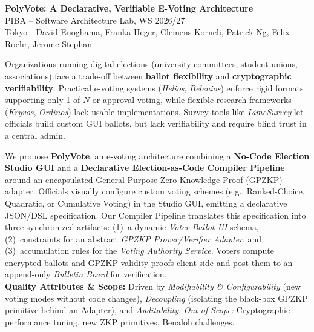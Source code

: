 \documentclass[11pt,a4paper]{article}
\newcommand{\pibapart}[1]{\vspace{0.4em}{\large\textbf{#1}}\par}
\newcommand{\projecttitle}{PolyVote: A Declarative, Verifiable E-Voting Architecture}
\newcommand{\teamname}{Tokyo}
\newcommand{\teammembers}{David Enoghama, Franka Heger, Clemens Korneli, Patrick Ng, Felix Roehr, Jerome Stephan}
\begin{document}
\begin{center}
  {\LARGE\textbf{\projecttitle}}\\[0.4em]
  {\large PIBA -- Software Architecture Lab, WS 2026/27}\\[0.3em]
  \teamname\ \textbullet\ \teammembers
\end{center}

\pibapart{Problem}
Organizations running digital elections (university committees, student unions, associations) face a trade-off between \textbf{ballot flexibility} and \textbf{cryptographic verifiability}. Practical e-voting systems (\emph{Helios}, \emph{Belenios}) enforce rigid formats supporting only 1-of-$N$ or approval voting, while flexible research frameworks (\emph{Kryvos}, \emph{Ordinos}) lack usable implementations. Survey tools like \emph{LimeSurvey} let officials build custom GUI ballots, but lack verifiability and require blind trust in a central admin.

\pibapart{Idea}
We propose \textbf{PolyVote}, an e-voting architecture combining a \textbf{No-Code Election Studio GUI} and a \textbf{Declarative Election-as-Code Compiler Pipeline} around an encapsulated General-Purpose Zero-Knowledge Proof (GPZKP) adapter. Officials visually configure custom voting schemes (e.g., Ranked-Choice, Quadratic, or Cumulative Voting) in the Studio GUI, emitting a declarative JSON/DSL specification. Our Compiler Pipeline translates this specification into three synchronized artifacts: (1)~a dynamic \emph{Voter Ballot UI} schema, (2)~constraints for an abstract \emph{GPZKP Prover/Verifier Adapter}, and (3)~accumulation rules for the \emph{Voting Authority Service}. Voters compute encrypted ballots and GPZKP validity proofs client-side and post them to an append-only \emph{Bulletin Board} for verification.\\
\textbf{Quality Attributes \& Scope:} Driven by \emph{Modifiability \& Configurability} (new voting modes without code changes), \emph{Decoupling} (isolating the black-box GPZKP primitive behind an Adapter), and \emph{Auditability}. \emph{Out of Scope:} Cryptographic performance tuning, new ZKP primitives, Benaloh challenges.
\end{document}
